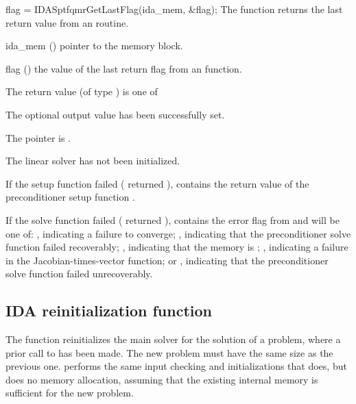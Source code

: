 {{
  flag = IDASptfqmrGetLastFlag(ida\_mem, \&flag);
}
{
  The function  returns the
  last return value from an {\idasptfqmr} routine. 
}
{
  \begin{args}
  \item[ida\_mem] ()
    pointer to the {\ida} memory block.
  \item[flag] ()
    the value of the last return flag from an {\idasptfqmr} function.
  \end{args}
}
{
  The return value  (of type ) is one of
  \begin{args}
  \item[\Id{IDASPTFQMR\_SUCCESS}] 
    The optional output value has been successfully set.
  \item[\Id{IDASPTFQMR\_MEM\_NULL}]
    The  pointer is .
  \item[\Id{IDASPTFQMR\_LMEM\_NULL}]
    The {\idasptfqmr} linear solver has not been initialized.
  \end{args}
}
{
  If the {\idasptfqmr} setup function failed ( 
  returned ),
   contains the return value of the preconditioner 
  setup function .

  If the {\idasptfqmr} solve function failed ( returned 
  ),  contains the error flag from
   and will be one of:
  , indicating a failure to converge;
  , indicating that the preconditioner solve
  function  failed recoverably;
  , indicating that the {\sptfqmr} memory is ;
  , indicating a failure in the Jacobian-times-vector 
  function; or
  , indicating that the preconditioner solve
  function  failed unrecoverably.
}


\subsection{IDA reinitialization function}\label{sss:idareinit}

The function  reinitializes the main {\ida} solver for
the solution of a problem, where a prior call to  has
been made. The new problem must have the same size as the previous one.
 performs the same input checking and initializations 
that  does, but does no memory allocation, assuming that the 
existing internal memory is sufficient for the new problem.             
                                                                 
}
